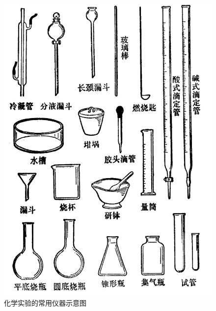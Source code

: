 \label{sec:xssy-yiqi}

\begin{figure}[H]
    \centering
    \includegraphics[width=\textwidth]{../pic/czhx1-xssy-yiqi-1.png}
    \caption*{化学实验的常用仪器示意图}
\end{figure}

